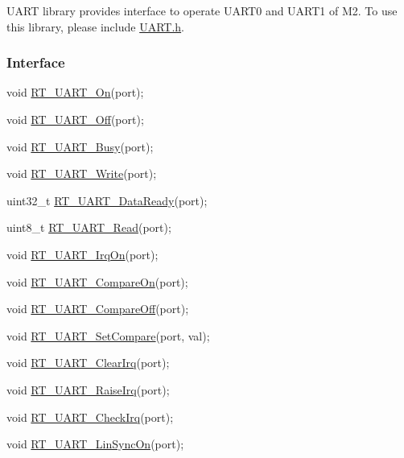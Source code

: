 U\+A\+RT library provides interface to operate U\+A\+R\+T0 and U\+A\+R\+T1 of M2. To use this library, please include {\ttfamily \mbox{\hyperlink{a00056}{U\+A\+R\+T.\+h}}}.

\subsubsection*{Interface}


\begin{DoxyCode}
\textcolor{keywordtype}{void} \mbox{\hyperlink{a00056_a7c1428a7b16eec7fe710679dd70b4069}{RT\_UART\_On}}(port);

\textcolor{keywordtype}{void} \mbox{\hyperlink{a00056_a60de547d761052a56b69e4a75493b831}{RT\_UART\_Off}}(port);

\textcolor{keywordtype}{void} \mbox{\hyperlink{a00056_a3ab834a97a200601f16b923a705f3f01}{RT\_UART\_Busy}}(port);

\textcolor{keywordtype}{void} \mbox{\hyperlink{a00056_a3c30d4d2e260d1c2f96747e9d7bdaf0d}{RT\_UART\_Write}}(port);

uint32\_t \mbox{\hyperlink{a00056_abd2a573ae35e4f6381f9f9758a12806b}{RT\_UART\_DataReady}}(port);

uint8\_t \mbox{\hyperlink{a00056_a7804645fb092b24545278660f6b66409}{RT\_UART\_Read}}(port);

\textcolor{keywordtype}{void} \mbox{\hyperlink{a00056_a5ed058b5d506df45c51358b8451550ad}{RT\_UART\_IrqOn}}(port);

\textcolor{keywordtype}{void} \mbox{\hyperlink{a00056_aab5e3da11e9f9d531cab23aa451d2356}{RT\_UART\_CompareOn}}(port);

\textcolor{keywordtype}{void} \mbox{\hyperlink{a00056_aab59c28b31f6d93c8400c2af10cc0b05}{RT\_UART\_CompareOff}}(port);

\textcolor{keywordtype}{void} \mbox{\hyperlink{a00056_a432520c6f67a10918aa07884250a7cbc}{RT\_UART\_SetCompare}}(port, val);

\textcolor{keywordtype}{void} \mbox{\hyperlink{a00056_a84e87fc64f3149f1d5171ddca5719220}{RT\_UART\_ClearIrq}}(port);

\textcolor{keywordtype}{void} \mbox{\hyperlink{a00056_ad8934a303c429b70176995f2dd6ac67b}{RT\_UART\_RaiseIrq}}(port);

\textcolor{keywordtype}{void} \mbox{\hyperlink{a00056_a3e29e879f76b82a13419f4d59a1c3053}{RT\_UART\_CheckIrq}}(port);

\textcolor{keywordtype}{void} \mbox{\hyperlink{a00056_a49f9d43f5fd87ceed952123010e015fa}{RT\_UART\_LinSyncOn}}(port);


\end{DoxyCode}
